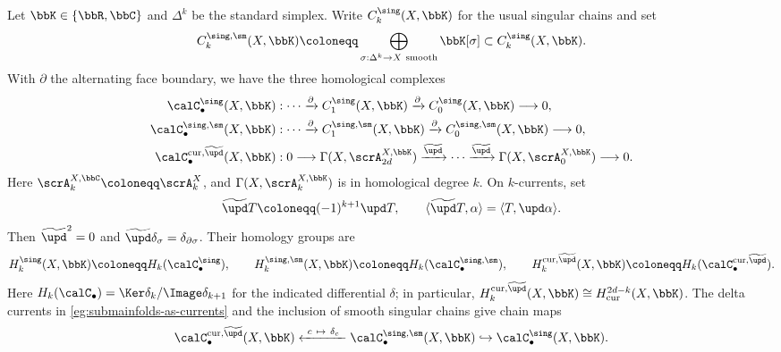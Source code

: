 \begin{construction}[label=\labelNFM{constr:cohomology-by-forms-and-currents}, status=draft, tag=0000000]
	Let $\bbK \in \{\bbR,\bbC\}$ and $\Delta^k$ be the standard simplex.
	Write $C_k^\sing(X,\bbK)$ for the usual singular chains and set
	\[ C_k^{\sing,\sm}(X,\bbK) \coloneqq \bigoplus_{\sigma : \Delta^k \to X\ \mathrm{smooth}} \bbK[\sigma] \subset C_k^\sing(X,\bbK). \]
	With $\partial$ the alternating face boundary, we have the three homological complexes
	\begin{align*}
		\calC_\bullet^\sing(X,\bbK)                           & : \cdots \xrightarrow{\partial} C_1^\sing(X,\bbK) \xrightarrow{\partial} C_0^\sing(X,\bbK) \longrightarrow 0,                                                        \\
		\calC_\bullet^{\sing,\sm}(X,\bbK)                     & : \cdots \xrightarrow{\partial} C_1^{\sing,\sm}(X,\bbK) \xrightarrow{\partial} C_0^{\sing,\sm}(X,\bbK) \longrightarrow 0,                                            \\
		\calC_\bullet^{\mathrm{cur},\widetilde{\upd}}(X,\bbK) & : 0 \longrightarrow \Gamma(X,\scrA_{2d}^{X,\bbK}) \xrightarrow{\widetilde{\upd}} \cdots \xrightarrow{\widetilde{\upd}} \Gamma(X,\scrA_0^{X,\bbK}) \longrightarrow 0.
	\end{align*}
	Here $\scrA_k^{X,\bbC} \coloneqq \scrA_k^X$, and $\Gamma(X,\scrA_k^{X,\bbK})$ is in homological degree $k$.
	On $k$-currents, set
	\[ \widetilde{\upd}T \coloneqq (-1)^{k+1}\upd T,\qquad \langle \widetilde{\upd}T,\alpha \rangle = \langle T,\upd\alpha \rangle. \]
	Then $\widetilde{\upd}^2 = 0$ and $\widetilde{\upd}\delta_\sigma = \delta_{\partial\sigma}$.
	Their homology groups are
	\[ H_k^\sing(X,\bbK) \coloneqq H_k(\calC_\bullet^\sing),\qquad H_k^{\sing,\sm}(X,\bbK) \coloneqq H_k(\calC_\bullet^{\sing,\sm}),\qquad H_k^{\mathrm{cur},\widetilde{\upd}}(X,\bbK) \coloneqq H_k(\calC_\bullet^{\mathrm{cur},\widetilde{\upd}}). \]
	Here $H_k(\calC_\bullet) = \Ker\delta_k/\Image\delta_{k+1}$ for the indicated differential $\delta$;
	in particular, $H_k^{\mathrm{cur},\widetilde{\upd}}(X,\bbK) \cong H_\mathrm{cur}^{2d-k}(X,\bbK)$.
	The delta currents in \cref{eg:submainfolds-as-currents} and the inclusion of smooth singular chains give chain maps
	\begin{equation}\label{eq:inclusion-of-complexes-of-cycles}
		\calC_\bullet^{\mathrm{cur},\widetilde{\upd}}(X,\bbK) \xleftarrow{\ c\ \mapsto \ \delta_c\ } \calC_\bullet^{\sing,\sm}(X,\bbK) \hookrightarrow \calC_\bullet^\sing(X,\bbK).
	\end{equation}
\end{construction}

